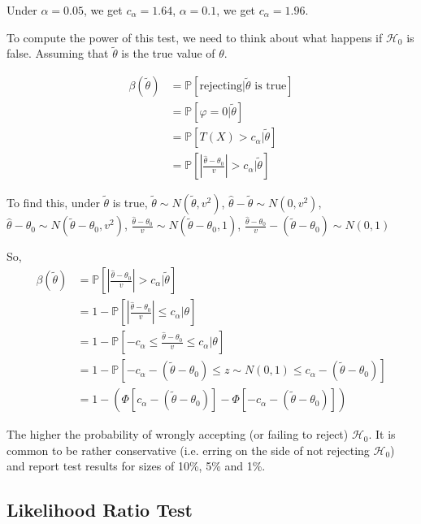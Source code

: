 \documentclass{article}
\begin{document}
Under $\alpha = 0.05$, we get $c_{\alpha} = 1.64$, $\alpha = 0.1$, we get
$c_{\alpha} = 1.96$.

To compute the power of this test, we need to think about what happens if
$\mathcal{H}_0$ is false. Assuming that $\tilde{\theta}$ is the true value of
$\theta$.

\begin{align*}
  \beta (\tilde{\theta}) & = \mathbb{P} [\text{rejecting} |
  \widetilde{\theta} \text{ is true}]\\
  & = \mathbb{P} [\varphi = 0 | \widetilde{\theta}]\\
  & = \mathbb{P} [T (X) > c_{\alpha} | \widetilde{\theta}]\\
  & = \mathbb{P} \left[ \left| \frac{\hat{\theta} - \theta_0}{v} \right| >
  c_{\alpha} | \widetilde{\theta} \right]
\end{align*}

To find this, under $\tilde{\theta}$ is true, $\tilde{\theta} \sim N
(\tilde{\theta}, v^2)$, $\hat{\theta} - \tilde{\theta} \sim N (0, v^2)$,
$\hat{\theta} - \theta_0 \sim N (\tilde{\theta} - \theta_0, v^2)$,
$\frac{\hat{\theta} - \theta_0}{v} \sim N (\tilde{\theta} - \theta_0, 1)$,
$\frac{\hat{\theta} - \theta_0}{v} - (\tilde{\theta} - \theta_0) \sim N (0,
1)$

So,
\begin{align*}
  \beta (\tilde{\theta}) & = \mathbb{P} \left[ \left| \frac{\hat{\theta} -
  \theta_0}{v} \right| > c_{\alpha} | \widetilde{\theta}
  \right]\\
  & = 1 - \mathbb{P} \left[ \left| \frac{\hat{\theta} - \theta_0}{v}
  \right| \leq c_{\alpha} | \theta \right]\\
  & = 1 - \mathbb{P} \left[ - c_{\alpha} \leq \frac{\hat{\theta} -
  \theta_0}{v} \leq c_{\alpha} | \theta \right]\\
  & = 1 - \mathbb{P} [- c_{\alpha} - (\tilde{\theta} - \theta_0) \leq z
  \sim N (0, 1) \leq c_{\alpha} - (\tilde{\theta} - \theta_0)]\\
  & = 1 - (\Phi [c_{\alpha} - (\tilde{\theta} - \theta_0)] - \Phi [-
  c_{\alpha} - (\tilde{\theta} - \theta_0)])
\end{align*}

The higher the probability of wrongly accepting (or failing to reject)
$\mathcal{H}_0$. It is common to be rather conservative (i.e. erring on the
side of not rejecting $\mathcal{H}_0$) and report test results for sizes of
10\%, 5\% and 1\%.

\subsection{Likelihood Ratio Test}
\end{document}
